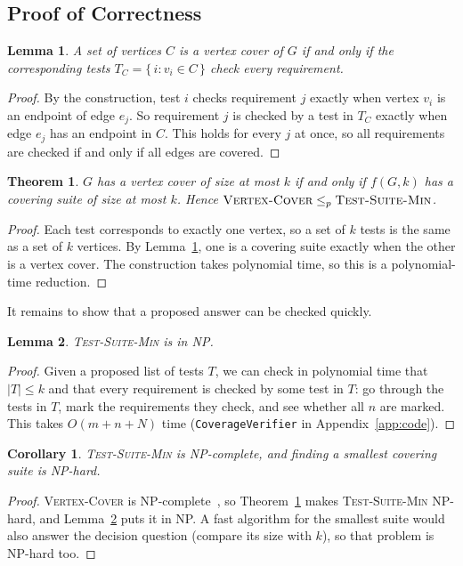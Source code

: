 \documentclass[conference]{IEEEtran}
\newtheorem{theorem}{Theorem}
\newtheorem{lemma}{Lemma}
\newtheorem{corollary}{Corollary}
\theoremstyle{definition}
\theoremstyle{remark}
\newcommand{\TSM}{\textsc{Test-Suite-Min}}
\newcommand{\VC}{\textsc{Vertex-Cover}}
\begin{document}
\subsection{Proof of Correctness}
\begin{lemma}\label{lem:subset}
A set of vertices $C$ is a vertex cover of $G$ if and only if the
corresponding tests $T_C = \{\, i : v_i \in C \,\}$ check every requirement.
\end{lemma}
\begin{proof}
By the construction, test $i$ checks requirement $j$ exactly when vertex
$v_i$ is an endpoint of edge $e_j$. So requirement $j$ is checked by a test
in $T_C$ exactly when edge $e_j$ has an endpoint in $C$. This holds for every
$j$ at once, so all requirements are checked if and only if all edges are
covered.
\end{proof}

\begin{theorem}\label{thm:reduction}
$G$ has a vertex cover of size at most $k$ if and only if $f(G,k)$ has a
covering suite of size at most $k$. Hence $\VC{} \le_p \TSM{}$.
\end{theorem}
\begin{proof}
Each test corresponds to exactly one vertex, so a set of $k$ tests is the
same as a set of $k$ vertices. By Lemma~\ref{lem:subset}, one is a covering
suite exactly when the other is a vertex cover. The construction takes
polynomial time, so this is a polynomial-time reduction.
\end{proof}

It remains to show that a proposed answer can be checked quickly.

\begin{lemma}\label{lem:np}
\TSM{} is in NP.
\end{lemma}
\begin{proof}
Given a proposed list of tests $T$, we can check in polynomial time that
$|T| \le k$ and that every requirement is checked by some test in $T$: go
through the tests in $T$, mark the requirements they check, and see whether
all $n$ are marked. This takes $O(m + n + N)$ time
(\texttt{CoverageVerifier} in Appendix~\ref{app:code}).
\end{proof}

\begin{corollary}\label{cor:npc}
\TSM{} is NP-complete, and finding a smallest covering suite is NP-hard.
\end{corollary}
\begin{proof}
\VC{} is NP-complete~\cite{karp1972}, so Theorem~\ref{thm:reduction} makes
\TSM{} NP-hard, and Lemma~\ref{lem:np} puts it in NP. A fast algorithm for
the smallest suite would also answer the decision question (compare its size
with $k$), so that problem is NP-hard too.
\end{proof}
\end{document}
